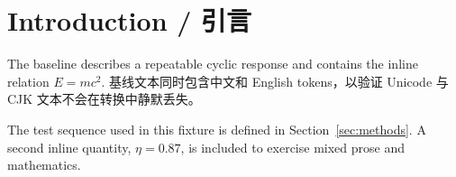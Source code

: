 \section{Introduction / 引言}
\label{sec:intro}

The baseline describes a repeatable cyclic response and contains the inline
relation $E=mc^2$. 基线文本同时包含中文和 English tokens，以验证 Unicode 与 CJK
文本不会在转换中静默丢失。

The test sequence used in this fixture is defined in
Section~\ref{sec:methods}. A second inline quantity, $\eta=0.87$, is included
to exercise mixed prose and mathematics.
